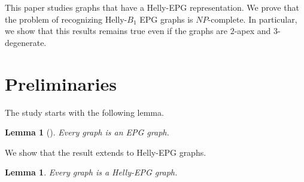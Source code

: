 \documentclass[
submission
]{dmtcs-episciences}
\newtheorem{lemma}[theorem]{Lemma}
\begin{document}
 This paper studies graphs that have a Helly-EPG representation. We prove that the problem of recognizing Helly-$B_1$ EPG graphs is $NP$-complete. In particular, we show that  this results remains true even if the graphs are $2$-apex and $3$-degenerate.


\section{Preliminaries}

The study starts with the following lemma.
 
 \begin{lemma}[\cite{golumbic2009}] \label{lem:todoGrafoEpg}
 Every graph is an EPG graph.
 \end{lemma}
 
 
 
 We show that the result extends to  Helly-EPG graphs.
 
 \begin{lemma}\label{lem:todoGrafoEpgHelly}
 Every graph is a Helly-EPG  graph.
 \end{lemma}
  
\end{document}
